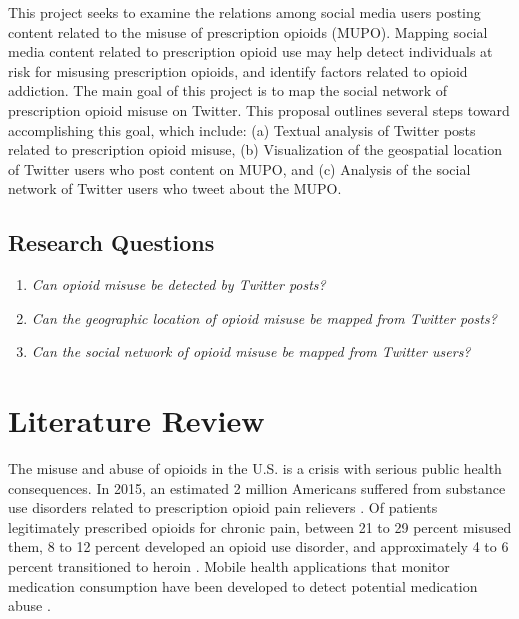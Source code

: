 \documentclass[sigconf]{acmart}
\begin{document}
This project seeks to examine the relations among social media users posting 
content related to the misuse of prescription opioids (MUPO). Mapping social 
media content related to prescription opioid use may help detect individuals 
at risk for misusing prescription opioids, and identify factors related to 
opioid addiction. The main goal of this project is to map the social network
of prescription opioid misuse on Twitter. This proposal outlines several steps 
toward accomplishing this goal, which include: (a) Textual analysis of Twitter 
posts related to prescription opioid misuse, (b) Visualization of the 
geospatial location of Twitter users who post content on MUPO, and (c) Analysis 
of the social network of Twitter users who tweet about the MUPO. 

\subsection{Research Questions} 
\begin{enumerate}
    \item \emph{Can opioid misuse be detected by Twitter posts?} 
    \item \emph{Can the geographic location of opioid misuse be mapped 
    from Twitter posts?} 
    \item \emph{Can the social network of opioid misuse be mapped from 
    Twitter users?}  
\end{enumerate}

\section{Literature Review} 

The misuse and abuse of opioids in the U.S. is a crisis with serious public 
health consequences. In 2015, an estimated 2 million Americans suffered from 
substance use disorders related to prescription opioid pain relievers 
\cite{nida18, cdc18}. Of patients legitimately prescribed opioids for chronic 
pain, between 21 to 29 percent misused them, 8 to 12 percent developed an 
opioid use disorder, and approximately 4 to 6 percent transitioned to heroin 
\cite{vowles15, carlson16}. Mobile health applications that monitor medication 
consumption have been developed to detect potential medication abuse 
\cite{varshney13}.
\end{document}

